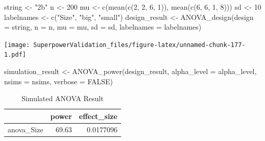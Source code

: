 \documentclass[
]{book}
\newenvironment{Shaded}{\begin{snugshade}}{\end{snugshade}}
\newcommand{\AttributeTok}[1]{\textcolor[rgb]{0.77,0.63,0.00}{#1}}
\newcommand{\ConstantTok}[1]{\textcolor[rgb]{0.00,0.00,0.00}{#1}}
\newcommand{\DecValTok}[1]{\textcolor[rgb]{0.00,0.00,0.81}{#1}}
\newcommand{\FunctionTok}[1]{\textcolor[rgb]{0.00,0.00,0.00}{#1}}
\newcommand{\NormalTok}[1]{#1}
\newcommand{\OtherTok}[1]{\textcolor[rgb]{0.56,0.35,0.01}{#1}}
\newcommand{\StringTok}[1]{\textcolor[rgb]{0.31,0.60,0.02}{#1}}
\begin{document}
\begin{Shaded}
\begin{Highlighting}[]
\NormalTok{string }\OtherTok{\textless{}{-}} \StringTok{"2b"}
\NormalTok{n }\OtherTok{\textless{}{-}} \DecValTok{200}
\NormalTok{mu }\OtherTok{\textless{}{-}} \FunctionTok{c}\NormalTok{(}\FunctionTok{mean}\NormalTok{(}\FunctionTok{c}\NormalTok{(}\DecValTok{2}\NormalTok{, }\DecValTok{2}\NormalTok{, }\DecValTok{6}\NormalTok{, }\DecValTok{1}\NormalTok{)), }\FunctionTok{mean}\NormalTok{(}\FunctionTok{c}\NormalTok{(}\DecValTok{6}\NormalTok{, }\DecValTok{6}\NormalTok{, }\DecValTok{1}\NormalTok{, }\DecValTok{8}\NormalTok{)))}
\NormalTok{sd }\OtherTok{\textless{}{-}} \DecValTok{10}
\NormalTok{labelnames }\OtherTok{\textless{}{-}} \FunctionTok{c}\NormalTok{(}\StringTok{"Size"}\NormalTok{, }\StringTok{"big"}\NormalTok{, }\StringTok{"small"}\NormalTok{)}
\NormalTok{design\_result }\OtherTok{\textless{}{-}} \FunctionTok{ANOVA\_design}\NormalTok{(}\AttributeTok{design =}\NormalTok{ string,}
                   \AttributeTok{n =}\NormalTok{ n, }
                   \AttributeTok{mu =}\NormalTok{ mu, }
                   \AttributeTok{sd =}\NormalTok{ sd, }
                   \AttributeTok{labelnames =}\NormalTok{ labelnames)}
\end{Highlighting}
\end{Shaded}

\texttt{[image: SuperpowerValidation\_files/figure-latex/unnamed-chunk-177-1.pdf]}

\begin{Shaded}
\begin{Highlighting}[]
\NormalTok{simulation\_result }\OtherTok{\textless{}{-}} \FunctionTok{ANOVA\_power}\NormalTok{(design\_result, }
                                 \AttributeTok{alpha\_level =}\NormalTok{ alpha\_level, }
                                 \AttributeTok{nsims =}\NormalTok{ nsims,}
                                 \AttributeTok{verbose =} \ConstantTok{FALSE}\NormalTok{)}
\end{Highlighting}
\end{Shaded}

\begin{table}[!h]

\caption{\label{tab:unnamed-chunk-179}Simulated ANOVA Result}
\centering
\begin{tabular}[t]{l|r|r}
\hline
  & power & effect\_size\\
\hline
anova\_Size & 69.63 & 0.0177096\\
\hline
\end{tabular}
\end{table}
\end{document}

